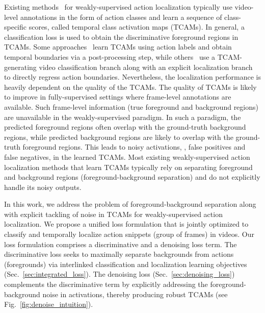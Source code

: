 \documentclass[final]{cvpr}
\begin{document}
Existing methods~\cite{hideseek,untrimnets,stpn,wtalc,autoloc} for weakly-supervised action localization typically use video-level annotations in the form of action classes and learn a sequence of class-specific scores, called temporal class activation maps (TCAMs). In general, a classification loss is used to obtain the discriminative foreground regions in TCAMs.
Some approaches~\cite{stpn,wtalc,3cnet,bg-modeling} learn TCAMs using action labels and obtain temporal boundaries via a post-processing step, while others~\cite{autoloc,cleannet} use a TCAM-generating video classification branch along with an explicit localization branch to directly regress action boundaries. 
Nevertheless, the localization performance is heavily dependent on the quality of the TCAMs. 
The quality of TCAMs is likely to improve in fully-supervised settings where frame-level annotations are available. 
Such frame-level information (true foreground and background regions) are unavailable in the weakly-supervised paradigm. In such a paradigm, the predicted foreground regions often overlap with the ground-truth background regions, while predicted background regions are likely to overlap with the ground-truth foreground regions. 
This leads to noisy activations, \ie, false positives and false negatives, in the learned TCAMs. Most existing weakly-supervised action localization methods that learn TCAMs typically rely on separating foreground and background regions (foreground-background separation) and do not explicitly handle its noisy outputs.




In this work, we address the problem of foreground-background separation along with explicit tackling of noise in TCAMs for weakly-supervised action localization. 
We propose a unified loss formulation that is jointly optimized to classify and temporally localize action snippets (group of frames) in videos. 
Our loss formulation comprises a discriminative and a denoising loss term.
The discriminative loss seeks to maximally separate backgrounds from actions (foregrounds) via interlinked classification and localization learning objectives (Sec.~\ref{sec:integrated_loss}). 
The denoising loss (Sec.~\ref{sec:denoising_loss}) complements the discriminative term by explicitly addressing the foreground-background noise in activations, thereby producing robust TCAMs (see Fig.~\ref{fig:denoise_intuition}).
\end{document}
